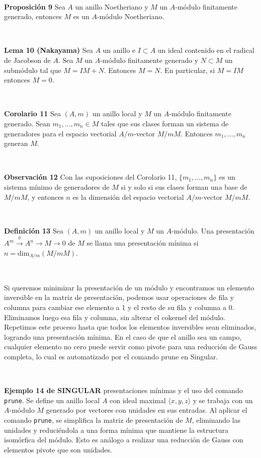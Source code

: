 \documentclass[10pt,a4paper]{article}
\begin{document}
\begin{enumerate}[label=(\alph*)]
\

\textbf{Proposición 9} Sea \( A \) un anillo Noetheriano y \( M \) un \( A \)-módulo finitamente generado, entonces \( M \) es un \( A \)-módulo Noetheriano.

\

\textbf{Lema 10 (Nakayama)} Sea \( A \) un anillo e \( I \subset A \) un ideal contenido en el radical de Jacobson de \( A \). Sea \( M \) un \( A \)-módulo finitamente generado y \( N \subset M \) un submódulo tal que \( M = IM + N \). Entonces \( M = N \). En particular, si \( M = IM \) entonces \( M = 0 \).

\

\textbf{Corolario 11} Sea \( (A, m) \) un anillo local y \( M \) un \( A \)-módulo finitamente generado. Sean \( m_1, \ldots, m_n \in M \) tales que sus clases forman un sistema de generadores para el espacio vectorial \( A/m \)-vector \( M/mM \). Entonces \( m_1, \ldots, m_n \) generan \( M \).

\

\textbf{Observación 12} Con las suposiciones del Corolario 11, \( \{m_1, \ldots, m_n\} \) es un sistema mínimo de generadores de \( M \) si y solo si sus clases forman una base de \( M/mM \), y entonces \( n \) es la dimensión del espacio vectorial \( A/m \)-vector \( M/mM \).

\

\textbf{Definición 13} Sea \( (A, m) \) un anillo local y \( M \) un \( A \)-módulo. Una presentación \( A^m \xrightarrow{\phi} A^n \rightarrow M \rightarrow 0 \) de \( M \) se llama una presentación mínima si \( n = \text{dim}_{A/m}(M/mM) \).

\

Si queremos minimizar la presentación de un módulo y encontramos un elemento inversible en la matriz de presentación, podemos usar operaciones de fila y columna para cambiar ese elemento a 1 y el resto de su fila y columna a 0. Eliminamos luego esa fila y columna, sin alterar el cokernel del módulo. Repetimos este proceso hasta que todos los elementos inversibles sean eliminados, logrando una presentación mínima. En el caso de que el anillo sea un campo, cualquier elemento no cero puede servir como pivote para una reducción de Gauss completa, lo cual es automatizado por el comando prune en Singular.

\

\textbf{Ejemplo 14 de SINGULAR} presentaciones mínimas y el uso del comando \texttt{prune}.
Se define un anillo local \( A \) con ideal maximal \( \langle x, y, z \rangle \) y se trabaja con un \( A \)-módulo \( M \) generado por vectores con unidades en sus entradas. Al aplicar el comando \texttt{prune}, se simplifica la matriz de presentación de \( M \), eliminando las unidades y reduciéndola a una forma mínima que mantiene la estructura isomórfica del módulo. Esto es análogo a realizar una reducción de Gauss con elementos pivote que son unidades.


\end{enumerate}
\end{document}

